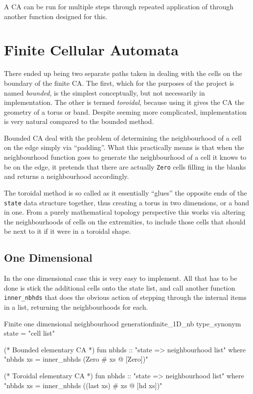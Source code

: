 A CA can be run for multiple steps through repeated application of  through another function designed for this.

\section{Finite Cellular Automata} \label{sec:finite_CA}

There ended up being two separate paths taken in dealing with the cells on the boundary of the finite CA.
The first,
which for the purposes of the project is named \emph{bounded},
is the simplest conceptually,
but not necessarily in implementation.
The other is termed \emph{toroidal},
because using it gives the CA the geometry of a torus or band.
Despite seeming more complicated,
implementation is very natural compared to the bounded method.

Bounded CA deal with the problem of determining the neighbourhood of a cell on the edge simply via ``padding''.
What this practically means is that when the neighbourhood function goes to generate the neighbourhood of a cell it knows to be on the edge,
it pretends that there are actually \texttt{Zero} cells filling in the blanks and returns a neighbourhood accordingly.

The toroidal method is so called as it essentially ``glues'' the opposite ends of the \texttt{state} data structure together,
thus creating a torus in two dimensions,
or a band in one.
From a purely mathematical topology perspective this works via altering the neighbourhoods of cells on the extremities,
to include those cells that should be next to it if it were in a toroidal shape.


\subsection{One Dimensional} 

In the one dimensional case this is very easy to implement.
All that has to be done is stick the additional cells onto the state list,
and call another function \texttt{inner_nbhds} that does the obvious action of stepping through the internal items in a list,
returning the neighbourhoods for each.

\begin{myminted}{Finite one dimensional neighbourhood generation}{finite_1D_nb}
    type_synonym state = "cell list"

    (* Bounded elementary CA *)
    fun nbhds :: "state => neighbourhood list" where
    "nbhds  xs = inner_nbhds (Zero # xs @ [Zero])"

    (* Toroidal elementary CA *)
    fun nbhds :: "state => neighbourhood list" where
    "nbhds xs = inner_nbhds ((last xs) # xs @ [hd xs])"
\end{myminted}

